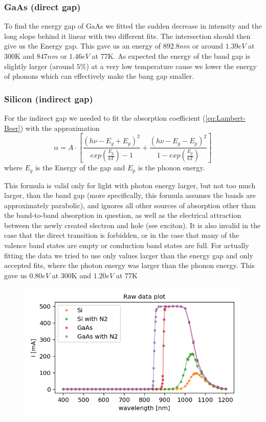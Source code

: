 \documentclass[]{article}
\begin{document}
\subsubsection{GaAs (direct gap)}
To find the energy gap of GaAs we fitted the sudden decrease in intensity and the long slope behind it linear with two different fits. The intersection should then give us the Energy gap. This gave us an energy of $892.8nm$ or around $1.39eV$ at 300K and $847nm$ or $1.46eV$ at 77K. As expected the energy of the band gap is slightly larger (around $5\%$) at a very low temperature cause we lower the energy of phonons which can effectively make the bang gap smaller. 

\subsubsection{Silicon (indirect gap)}
For the indirect gap we needed to fit the absorption coefficient (\ref{eq:Lambert-Beer}) with the approximation
\begin{equation}
\label{fit function}
\alpha = A\cdot \left[ \frac{(h\nu - E_g + E_p)^2}{exp\left(\frac{E_p}{kT}\right) -1} + \frac{(h\nu - E_g - E_p)^2}{1-exp\left(\frac{E_p}{kT}\right)} \right]
\end{equation}
where $E_g$ is the Energy of the gap and $E_p$ is the phonon energy.


This formula is valid only for light with photon energy larger, but not too much larger, than the band gap (more specifically, this formula assumes the bands are approximately parabolic), and ignores all other sources of absorption other than the band-to-band absorption in question, as well as the electrical attraction between the newly created electron and hole (see exciton). It is also invalid in the case that the direct transition is forbidden, or in the case that many of the valence band states are empty or conduction band states are full.\cite{absformular}
For actually fitting the data we tried to use only values larger than the energy gap and only accepted fits, where the photon energy was larger than the phonon energy. This gave us $0.80eV$ at 300K and $1.20eV$ at 77K


\begin{figure}
	\centering
	\includegraphics[width=0.7\linewidth]{"Plots/raw data"}
	\caption{}
	\label{fig:raw-data}
\end{figure}
\end{document}

